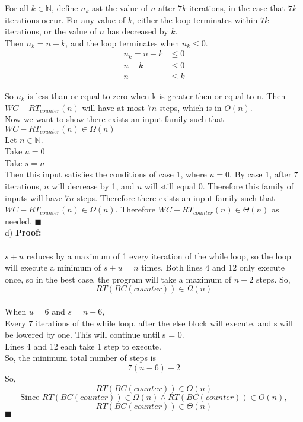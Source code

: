 \documentclass{article}
\newcommand{\N}{\mathbb{N}}
\begin{document}
\begin{enumerate}
	For all $k \in \N$, define $n_k$ ast the value of $n$ after $7k$ iterations, in the case that $7k$ iterations occur. For any value of $k$, either the loop terminates within $7k$ iterations, or the value of $n$ has decreased by $k$.\\
	
	Then $n_k = n - k$, and the loop terminates when $n_k \leq 0$.
	\begin{align*}
	 n_k = n - k &\leq 0\\
	 n - k &\leq 0\\
	 n &\leq k
	 \end{align*}
	 
	 So $n_k$ is less than or equal to zero when k is greater then or equal to n. Then $WC-RT_{counter}(n)$ will have at most $7n$ steps, which is in $O(n)$. \\
	 
	 Now we want to show there exists an input family such that $WC-RT_{counter}(n) \in \Omega(n)$\\
	 Let	$n \in \N$. \\
	 Take $u=0$ \\
	 Take $s = n$\\
	 
	 Then this input satisfies the conditions of case 1, where $u = 0$. By case 1, after 7 iterations, $n$ will decrease by 1, and $u$ will still equal 0. Therefore this family of inputs will have $7n$ steps. Therefore there exists an input family such that $WC-RT_{counter}(n) \in \Omega(n)$. Therefore $WC-RT_{counter}(n) \in \Theta(n)$ as needed.  \null\hfill $\blacksquare$\\ 
	 
	 d) \textbf{Proof:} \\\\
	 $s+u$ reduces by a maximum of 1 every iteration of the while loop, so the loop will execute a minimum of $s+u=n$ times. Both lines 4 and 12
	 only execute once, so in the best case, the program will take a maximum of $n+2$ steps. So, 
	 $$RT(BC(counter))\in \Omega(n)$$
	 \\
	 When $u=6$ and $s = n-6$,\\
	 Every 7 iterations of the while loop, after the else block will execute, and s will be lowered by one. This will continue until 
	 s = 0. \\ Lines 4 and 12 each take 1 step to execute. \\ So, the minimum total number of steps is $$7(n-6)+2$$
	 So, $$RT(BC(counter))\in O (n)$$
	 $$\text{Since } RT(BC(counter))\in \Omega (n) \wedge RT(BC(counter))\in O (n),$$
	 $$RT(BC(counter))\in \Theta (n)$$ 
	 \null\hfill $\blacksquare$\\
	 

\end{enumerate}
\end{document}
